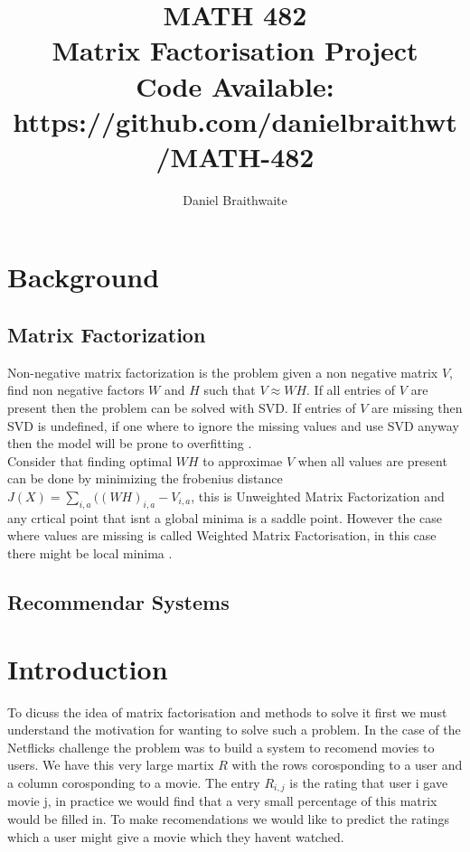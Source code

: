 \documentclass{article}
\title{%
	MATH 482\\
	\large Matrix Factorisation Project \\
	\small Code Available: https://github.com/danielbraithwt/MATH-482
}
\author{Daniel Braithwaite}
\begin{document}
\maketitle

\section{Background}
\subsection{Matrix Factorization}
Non-negative matrix factorization is the problem given a non negative matrix $V$, find non negative factors $W$ and $H$ such that $V \approx WH$. If all entries of $V$ are present then the problem can be solved with SVD. If entries of $V$ are missing then SVD is undefined, if one where to ignore the missing values and use SVD anyway then the model will be prone to overfitting \cite{koren2009matrix}.\\

Consider that finding optimal $WH$ to approximae $V$ when all values are present can be done by minimizing the frobenius distance $J(X) = \sum_{i,a} ((WH)_{i,a} - V_{i,a}$, this is Unweighted Matrix Factorization and any crtical point that isnt a global minima is a saddle point. However the case where values are missing is called Weighted Matrix Factorisation, in this case there might be local minima \cite{srebro2003weighted}.

\subsection{Recommendar Systems}

\section{Introduction}
To dicuss the idea of matrix factorisation and methods to solve it first we must understand the motivation for wanting to solve such a problem. In the case of the Netflicks challenge the problem was to build a system to recomend movies to users. We have this very large martix $R$ with the rows corosponding to a user and a column corosponding to a movie. The entry $R_{i,j}$ is the rating that user i gave movie j, in practice we would find that a very small percentage of this matrix would be filled in. To make recomendations we would like to predict the ratings which a user might give a movie which they havent watched.\\
\end{document}
